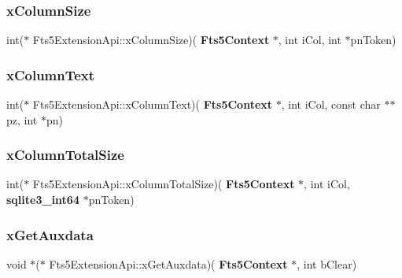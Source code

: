 \mbox{\label{struct_fts5_extension_api_ad1e249d1ce89ac0b05b77ea32a4da0cd}} 
\subsubsection{xColumnSize}
{\footnotesize\ttfamily int($\ast$ Fts5\+Extension\+Api\+::x\+Column\+Size)(\textbf{ Fts5\+Context} $\ast$, int i\+Col, int $\ast$pn\+Token)}

\mbox{\label{struct_fts5_extension_api_af1aedeaa82104e3e0495ed22610ad4bc}} 
\subsubsection{xColumnText}
{\footnotesize\ttfamily int($\ast$ Fts5\+Extension\+Api\+::x\+Column\+Text)(\textbf{ Fts5\+Context} $\ast$, int i\+Col, const char $\ast$$\ast$pz, int $\ast$pn)}

\mbox{\label{struct_fts5_extension_api_acfc4e9d9879578a4b9347d7876d28963}} 
\subsubsection{xColumnTotalSize}
{\footnotesize\ttfamily int($\ast$ Fts5\+Extension\+Api\+::x\+Column\+Total\+Size)(\textbf{ Fts5\+Context} $\ast$, int i\+Col, \textbf{ sqlite3\+\_\+int64} $\ast$pn\+Token)}

\mbox{\label{struct_fts5_extension_api_ab18b1cb62e84590f50c0e007366165fb}} 
\subsubsection{xGetAuxdata}
{\footnotesize\ttfamily void $\ast$($\ast$ Fts5\+Extension\+Api\+::x\+Get\+Auxdata)(\textbf{ Fts5\+Context} $\ast$, int b\+Clear)}

\mbox{\label{struct_fts5_extension_api_af2f1796923ab2d48be770e860e7494cb}} 
